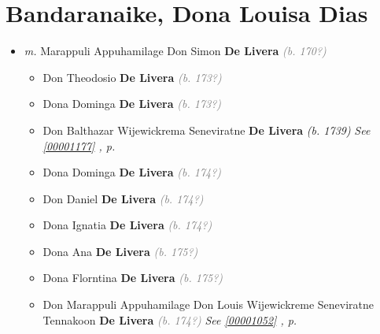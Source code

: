 \documentclass[10pt, openany]{book}
\begin{document}
\chapter{Bandaranaike, Dona Louisa Dias}
\label{00001043}
\textcolor{slmaroon}{\textit{}}
\begin{itemize}
\item{\textit{m.} Marappuli Appuhamilage Don Simon \textbf{De Livera} \textcolor{gray}{\textit{(b. 170?)}}   \label{couple:00001043:00001044} \begin{itemize}
\item{Don Theodosio \textbf{De Livera} \textcolor{gray}{\textit{(b. 173?)}}
   }
\item{Dona Dominga \textbf{De Livera} \textcolor{gray}{\textit{(b. 173?)}}
   }
\item{Don Balthazar Wijewickrema Seneviratne \textbf{De Livera} \textcolor{slorange}{\textit{(b. 1739)}} \textcolor{slteal}{\textit{See  \autoref{00001177} \textit{, p. \pageref{00001177} }}}}
\item{Dona Dominga \textbf{De Livera} \textcolor{gray}{\textit{(b. 174?)}}
   }
\item{Don Daniel \textbf{De Livera} \textcolor{gray}{\textit{(b. 174?)}}
   }
\item{Dona Ignatia \textbf{De Livera} \textcolor{gray}{\textit{(b. 174?)}}
   }
\item{Dona Ana \textbf{De Livera} \textcolor{gray}{\textit{(b. 175?)}}
   }
\item{Dona Florntina \textbf{De Livera} \textcolor{gray}{\textit{(b. 175?)}}
   }
\item{Don Marappuli Appuhamilage Don Louis Wijewickreme Seneviratne Tennakoon \textbf{De Livera} \textcolor{gray}{\textit{(b. 174?)}} \textcolor{slteal}{\textit{See  \autoref{00001052} \textit{, p. \pageref{00001052} }}}}
\end{itemize}}
\end{itemize}
   
\end{document}
